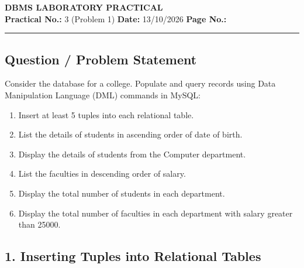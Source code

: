 \label{exp:dml}
\label{exp:dml_prob1}
\noindent
\begin{center}
    {\LARGE \textbf{DBMS LABORATORY PRACTICAL}}\\[0.25cm]
    \textbf{Practical No.:} 3 (Problem 1) \hfill \textbf{Date:} 13/10/2026 \hfill \textbf{Page No.:} \thepage
\end{center}
\vspace{-0.2cm}
\hrule
\vspace{0.35cm}

\subsection*{Question / Problem Statement}
Consider the database for a college. Populate and query records using Data Manipulation Language (DML) commands in MySQL:
\begin{enumerate}[noitemsep,topsep=2pt]
    \item[(i)] Insert at least 5 tuples into each relational table.
    \item[(ii)] List the details of students in ascending order of date of birth.
    \item[(iii)] Display the details of students from the Computer department.
    \item[(iv)] List the faculties in descending order of salary.
    \item[(v)] Display the total number of students in each department.
    \item[(vi)] Display the total number of faculties in each department with salary greater than 25000.
\end{enumerate}

\subsection*{1. Inserting Tuples into Relational Tables}

